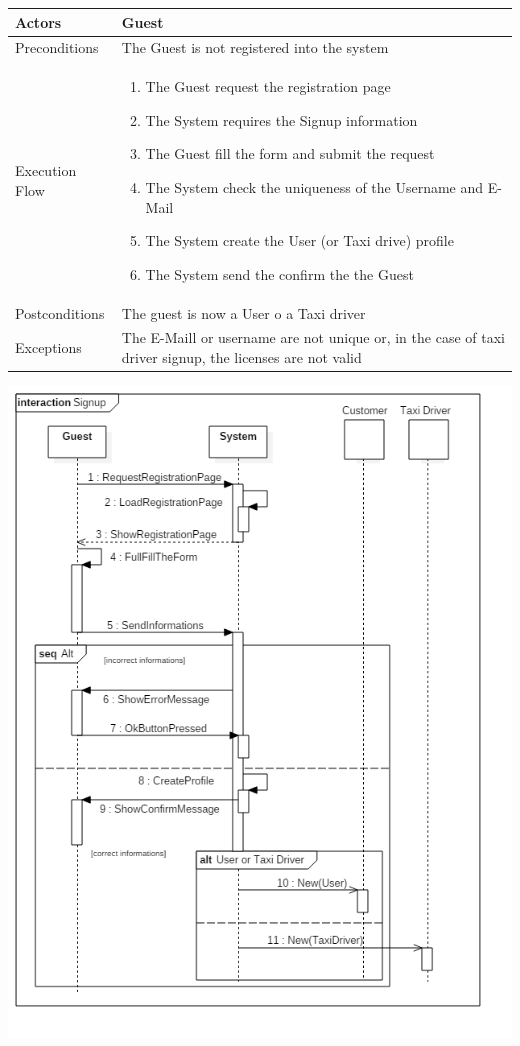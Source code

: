 \documentclass[english]{article}
\begin{document}
\begin{tabular}{lp{8cm}}
\hline
Actors & Guest \\
\hline
Preconditions &  The Guest is not registered into the system \\
\hline
Execution Flow &  
		\begin{enumerate}
			\item The Guest request the registration page
			\item The System requires the Signup information
			\item The Guest fill the form and submit the request
			\item The System check the uniqueness of the Username and E-Mail
			\item The System create the User (or Taxi drive) profile
			\item The System send the confirm the the Guest
		\end{enumerate} 
	\\ 
\hline
Postconditions & The guest is now a User o a Taxi driver \\
\hline
Exceptions & The E-Maill or username are not unique or, in the case of taxi driver signup, the licenses are not valid
\end{tabular}

\includegraphics[width=\textwidth]{Signup}
\end{document}
